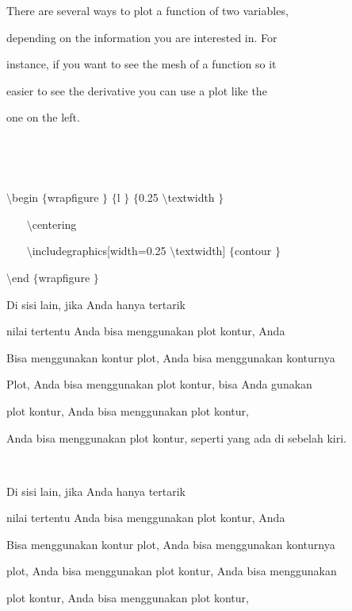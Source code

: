 There are several ways to plot a function of two variables,  \par
\noindent
depending on the information you are interested in. For  \par
\noindent
instance, if you want to see the mesh of a function so it  \par
\noindent
easier to see the derivative you can use a plot like the  \par
\noindent
one on the left. \par
\noindent
 $  $ \par
\noindent
 $  $ \par
\noindent
 $  \setminus $begin $  \{  $wrapfigure $  \}  $ $  \{  $l $  \}  $ $  \{  $0.25 $  \setminus $textwidth $  \}  $ \par
\vspace{12pt}
\noindent
~~~  $  \setminus $centering \par
\vspace{12pt}
\noindent
~~~  $  \setminus $includegraphics[width=0.25 $  \setminus $textwidth] $  \{  $contour $  \}  $ \par
\vspace{12pt}
\noindent
 $  \setminus $end $  \{  $wrapfigure $  \}  $ \par
\vspace{22pt}
\noindent
Di sisi lain, jika Anda hanya tertarik \par
\noindent
nilai tertentu Anda bisa menggunakan plot kontur, Anda \par
\noindent
Bisa menggunakan kontur plot, Anda bisa menggunakan konturnya \par
\noindent
Plot, Anda bisa menggunakan plot kontur, bisa Anda gunakan \par
\noindent
plot kontur, Anda bisa menggunakan plot kontur, \par
\noindent
Anda bisa menggunakan plot kontur, seperti yang ada di sebelah kiri. \par
\noindent
 $  $ \par
\noindent
Di sisi lain, jika Anda hanya tertarik \par
\noindent
nilai tertentu Anda bisa menggunakan plot kontur, Anda \par
\noindent
Bisa menggunakan kontur plot, Anda bisa menggunakan konturnya \par
\noindent
plot, Anda bisa menggunakan plot kontur, Anda bisa menggunakan \par
\noindent
plot kontur, Anda bisa menggunakan plot kontur, \par
